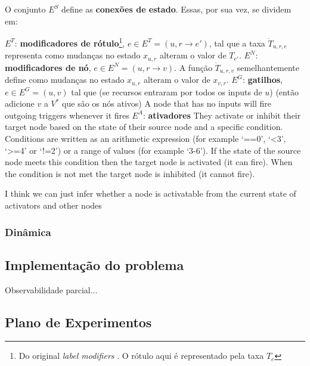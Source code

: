 \documentclass[10pt,a4paper]{article}
\newcommand{\note}[1]{
    \vspace{0.3cm}
    \colorbox{blue!30}{
            \begin{minipage}{0.4\textwidth}
		    \ttfamily \footnotesize
               #1
            \end{minipage}
        }
    \vspace{0.3cm}
}
\begin{document}
O conjunto $E^S$ define as \textbf{conexões de estado}. Essas, por sua vez, se dividem em:

\begin{outline}
    \1 $E^T$: \textbf{modificadores de rótulo}\footnote{Do original \textit{label modifiers} \parencite{machinations}. O rótulo aqui é representado pela taxa $T_e$}, $e \in E^T = (u, r\rightarrow e')$, tal que a taxa $\dot{T}_{u,r,e}$ representa como mudanças no estado $x_{u, r}$ alteram o valor de $T_{e'}$.
    \1 $E^N$: \textbf{modificadores de nó}, $e \in E^N = (u, r \rightarrow v)$. A função $\dot{T}_{u,r,v}$ semelhantemente define como mudanças no estado $x_{u, r}$ alteram o valor de $x_{v, r}$.
    \1 $E^G$: \textbf{gatilhos}, $e \in E^G = (u, v)$ tal que (se recursos entraram por todos os inputs de $u$) (então adicione $v$ a $V^*$ que são os nós ativos)
    A node that has no inputs will fire outgoing triggers whenever it fires
    \1 $E^A$: \textbf{ativadores} They activate or inhibit their target node
based on the state of their source node and a specific condition.  Conditions are written as an arithmetic expression (for example ‘==0’, ‘<3’, ‘>=4’ or ‘!=2’) or a range of values (for example ‘3-6’). If the state of the source node meets this condition then the target node is activated (it can fire). When the condition is not met the target node is inhibited (it cannot fire).
    \note{I think we can just infer whether a node is activatable from the current state of activators and other nodes}
\end{outline}

\subsubsection{Dinâmica}


\subsection{Implementação do problema}
\label{m:mdp}
Observabilidade parcial...

\subsection{Plano de Experimentos}
\label{m:experiments}

\printbibliography
\end{document}
